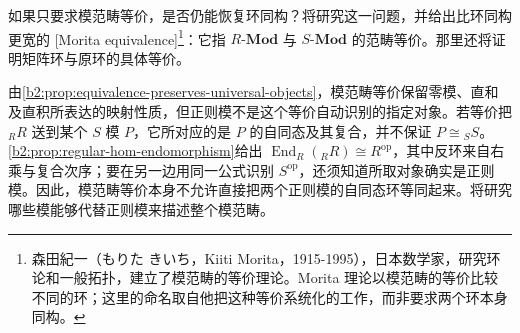 \ProseParagraphBreak
如果只要求模范畴等价，是否仍能恢复环同构？将研究这一问题，并给出比环同构更宽的 [Morita equivalence]\footnote{森田紀一（もりた きいち，Kiiti Morita，1915-1995），日本数学家，研究环论和一般拓扑，建立了模范畴的等价理论。Morita 理论以模范畴的等价比较不同的环；这里的命名取自他把这种等价系统化的工作，而非要求两个环本身同构。}：它指 \(R\text{-}\mathbf{Mod}\) 与 \(S\text{-}\mathbf{Mod}\) 的范畴等价。那里还将证明矩阵环与原环的具体等价。

\ProseParagraphBreak
由\cref{b2:prop:equivalence-preserves-universal-objects}，模范畴等价保留零模、直和及直积所表达的映射性质，但正则模不是这个等价自动识别的指定对象。若等价把 \({}_RR\) 送到某个 \(S\) 模 \(P\)，它所对应的是 \(P\) 的自同态及其复合，并不保证 \(P\cong{}_SS\)。\cref{b2:prop:regular-hom-endomorphism}给出 \(\operatorname{End}_R({}_RR)\cong R^{\mathrm{op}}\)，其中反环来自右乘与复合次序；要在另一边用同一公式识别 \(S^{\mathrm{op}}\)，还须知道所取对象确实是正则模。因此，模范畴等价本身不允许直接把两个正则模的自同态环等同起来。将研究哪些模能够代替正则模来描述整个模范畴。

